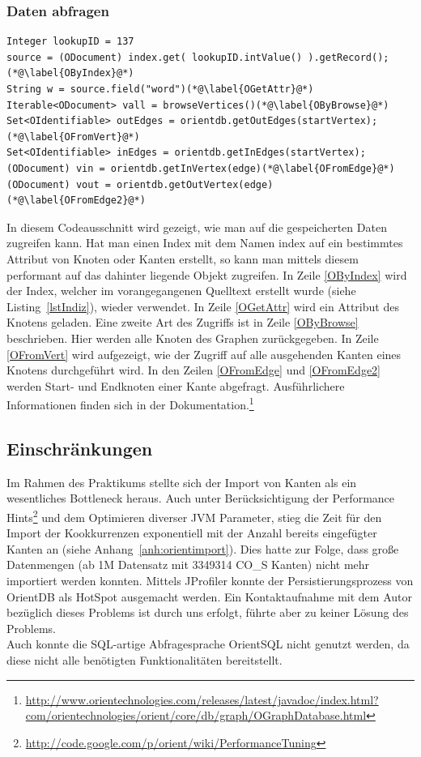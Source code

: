 \documentclass[11pt, a4paper, oneside]{article} %
\begin{document}
\subsubsection{Daten abfragen}

\begin{lstlisting}[caption={OrientDB - Daten abfragen}]
Integer lookupID = 137
source = (ODocument) index.get( lookupID.intValue() ).getRecord();(*@\label{OByIndex}@*)
String w = source.field("word")(*@\label{OGetAttr}@*)
Iterable<ODocument> vall = browseVertices()(*@\label{OByBrowse}@*)
Set<OIdentifiable> outEdges = orientdb.getOutEdges(startVertex); (*@\label{OFromVert}@*)
Set<OIdentifiable> inEdges = orientdb.getInEdges(startVertex);
(ODocument) vin = orientdb.getInVertex(edge)(*@\label{OFromEdge}@*)
(ODocument) vout = orientdb.getOutVertex(edge) (*@\label{OFromEdge2}@*)
\end{lstlisting}

In diesem Codeausschnitt wird gezeigt, wie man auf die gespeicherten Daten zugreifen kann. Hat man einen Index mit dem Namen \glqq{}index\grqq{} auf ein bestimmtes Attribut von Knoten oder Kanten erstellt, so kann man mittels diesem performant auf das dahinter liegende Objekt zugreifen. In Zeile \ref{OByIndex} wird der Index, welcher im vorangegangenen Quelltext erstellt wurde (siehe Listing~\ref{lstIndiz}), wieder verwendet. In Zeile \ref{OGetAttr} wird ein Attribut des Knotens geladen. 
Eine zweite Art des Zugriffs ist in Zeile \ref{OByBrowse} beschrieben. Hier werden alle Knoten des Graphen zurückgegeben. In Zeile \ref{OFromVert} wird aufgezeigt, wie der Zugriff auf alle ausgehenden Kanten eines Knotens durchgeführt wird. In den Zeilen \ref{OFromEdge} und \ref{OFromEdge2} werden Start- und Endknoten einer Kante abgefragt. Ausführlichere Informationen finden sich in der Dokumentation.\footnote{\url{http://www.orientechnologies.com/releases/latest/javadoc/index.html?com/orientechnologies/orient/core/db/graph/OGraphDatabase.html}}


\subsection{Einschränkungen}

Im Rahmen des Praktikums stellte sich der Import von Kanten als ein wesentliches Bottleneck heraus. Auch unter Berücksichtigung der \glqq{}Performance Hints\grqq{}\footnote{\url{http://code.google.com/p/orient/wiki/PerformanceTuning}} und dem Optimieren diverser JVM Parameter, stieg die Zeit für den Import der Kookkurrenzen exponentiell mit der Anzahl bereits eingefügter Kanten an (siehe Anhang~\ref{anh:orientimport}). Dies hatte zur Folge, dass große Datenmengen (ab 1M Datensatz mit 3349314 CO\_{}S Kanten) nicht mehr importiert werden konnten. Mittels JProfiler konnte der Persistierungsprozess von OrientDB als HotSpot ausgemacht werden. Ein Kontaktaufnahme mit dem Autor bezüglich dieses Problems ist durch uns erfolgt, führte aber zu keiner Lösung des Problems.\\
Auch konnte die SQL-artige Abfragesprache OrientSQL nicht genutzt werden, da diese nicht alle benötigten Funktionalitäten bereitstellt.
\end{document}
